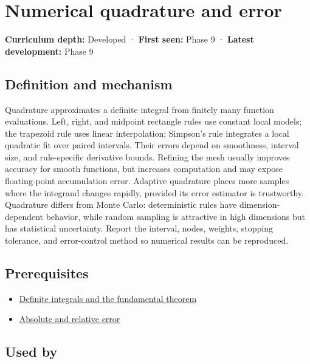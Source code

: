 \hypertarget{appendix-80521eae6b71}{}\label{referencestart:appendix-80521eae6b71}
\section{Numerical quadrature and error}\label{appendix-80521eae6b71-numerical-quadrature-and-error}

\textbf{Curriculum depth:} Developed · \textbf{First seen:} Phase 9 · \textbf{Latest development:} Phase 9

\subsection{Definition and mechanism}\label{appendix-80521eae6b71-definition-and-mechanism}

Quadrature approximates a definite integral from finitely many function evaluations. Left, right, and midpoint rectangle rules use constant local models; the trapezoid rule uses linear interpolation; Simpson's rule integrates a local quadratic fit over paired intervals. Their errors depend on smoothness, interval size, and rule-specific derivative bounds. Refining the mesh usually improves accuracy for smooth functions, but increases computation and may expose floating-point accumulation error. Adaptive quadrature places more samples where the integrand changes rapidly, provided its error estimator is trustworthy. Quadrature differs from Monte Carlo: deterministic rules have dimension-dependent behavior, while random sampling is attractive in high dimensions but has statistical uncertainty. Report the interval, nodes, weights, stopping tolerance, and error-control method so numerical results can be reproduced.

\subsection{Prerequisites}\label{appendix-80521eae6b71-prerequisites}

\begin{itemize}
\tightlist
\item
  \hyperref[appendix-1a50e72435c2]{Definite integrals and the fundamental theorem}
\item
  \hyperref[appendix-3ae74e89b4e6]{Absolute and relative error}
\end{itemize}

\subsection{Used by}\label{appendix-80521eae6b71-used-by}

